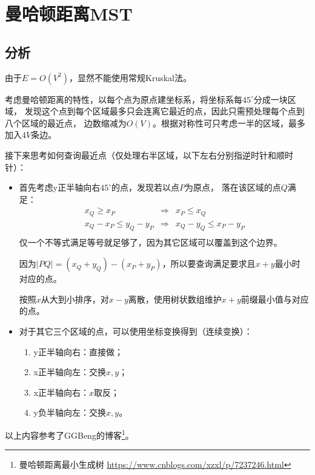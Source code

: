 \section{曼哈顿距离MST}
\subsection{分析}
由于$E=O(V^2)$，显然不能使用常规Kruskal法。

考虑曼哈顿距离的特性，以每个点为原点建坐标系，将坐标系每$45^\circ$分成一块区域，
发现这个点到每个区域最多只会连离它最近的点，因此只需预处理每个点到八个区域的最近点，
边数缩减为$O(V)$。根据对称性可只考虑一半的区域，最多加入$4V$条边。

接下来思考如何查询最近点（仅处理右半区域，以下左右分别指逆时针和顺时针）：

\begin{itemize}
	\item 首先考虑y正半轴向右$45^\circ$的点，发现若以点$P$为原点，
	      落在该区域的点$Q$满足：
	      \begin{eqnarray*}
		      x_Q\geq x_P&\Rightarrow&x_P\leq x_Q\\
		      x_Q-x_P\leq y_Q-y_P&\Rightarrow&x_Q-y_Q\leq x_P-y_P\\
	      \end{eqnarray*}
	      仅一个不等式满足等号就足够了，因为其它区域可以覆盖到这个边界。

	      因为$|PQ|=(x_Q+y_Q)-(x_P+y_P)$，所以要查询满足要求且$x+y$最小时
	      对应的点。

	      按照$x$从大到小排序，对$x-y$离散，使用树状数组维护$x+y$前缀最小值与对应的点。
	\item 对于其它三个区域的点，可以使用坐标变换得到（连续变换）：
	      \begin{enumerate}
		      \item y正半轴向右：直接做；
		      \item x正半轴向左：交换$x,y$；
		      \item x正半轴向右：$x$取反；
		      \item y负半轴向左：交换$x,y$。
	      \end{enumerate}
\end{itemize}

以上内容参考了GGBeng的博客\footnote{曼哈顿距离最小生成树
	\url{https://www.cnblogs.com/xzxl/p/7237246.html}
}。
